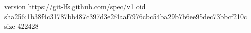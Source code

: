 version https://git-lfs.github.com/spec/v1
oid sha256:1b38f4c31787bb487c397d3e2f4aaf7976cbc54ba29b7b6ee95dec73bbcf210c
size 422428
